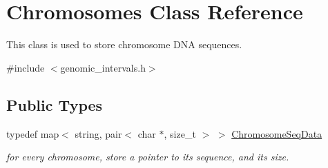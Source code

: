 \hypertarget{classChromosomes}{
\section{Chromosomes Class Reference}
\label{classChromosomes}
}


This class is used to store chromosome DNA sequences.  




{\ttfamily \#include $<$genomic\_\-intervals.h$>$}

\subsection*{Public Types}
\begin{DoxyCompactItemize}
\item 
\hypertarget{classChromosomes_a4a233d2b7fabc1a589cbbafd5d0ea243}{
typedef map$<$ string, pair$<$ char $\ast$, size\_\-t $>$ $>$ \hyperlink{classChromosomes_a4a233d2b7fabc1a589cbbafd5d0ea243}{ChromosomeSeqData}}
\label{classChromosomes_a4a233d2b7fabc1a589cbbafd5d0ea243}

\begin{DoxyCompactList}\small\item\em for every chromosome, store a pointer to its sequence, and its size. \end{DoxyCompactList}\end{DoxyCompactItemize}
